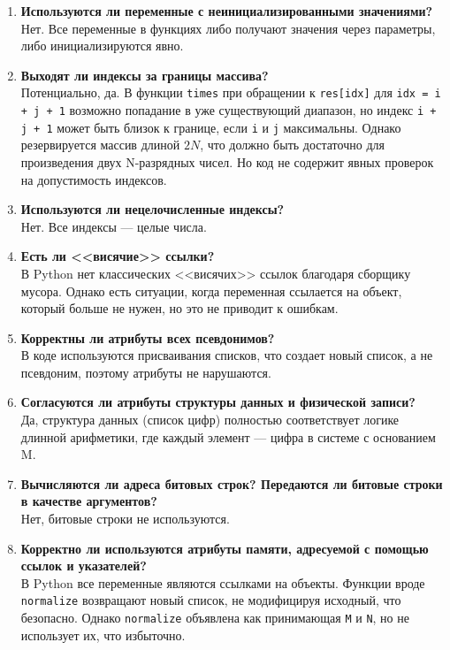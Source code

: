 \documentclass{article}[14pt]
\begin{document}
\begin{enumerate}

\item \textbf{Используются ли переменные с неинициализированными значениями?}
\\
Нет. Все переменные в функциях либо получают значения через параметры, либо инициализируются явно.

\item \textbf{Выходят ли индексы за границы массива?}
\\
Потенциально, да. В функции \texttt{times} при обращении к \texttt{res[idx]} для \texttt{idx = i + j + 1} возможно попадание в уже существующий диапазон, но индекс \texttt{i + j + 1} может быть близок к границе, если \texttt{i} и \texttt{j} максимальны. Однако резервируется массив длиной \(2N\), что должно быть достаточно для произведения двух N-разрядных чисел. Но код не содержит явных проверок на допустимость индексов.

\item \textbf{Используются ли нецелочисленные индексы?}
\\
Нет. Все индексы — целые числа.

\item \textbf{Есть ли <<висячие>> ссылки?}
\\
В Python нет классических <<висячих>> ссылок благодаря сборщику мусора. Однако есть ситуации, когда переменная ссылается на объект, который больше не нужен, но это не приводит к ошибкам.

\item \textbf{Корректны ли атрибуты всех псевдонимов?}
\\
В коде используются присваивания списков, что создает новый список, а не псевдоним, поэтому атрибуты не нарушаются.

\item \textbf{Согласуются ли атрибуты структуры данных и физической записи?}
\\
Да, структура данных (список цифр) полностью соответствует логике длинной арифметики, где каждый элемент — цифра в системе с основанием M.

\item \textbf{Вычисляются ли адреса битовых строк? Передаются ли битовые строки в качестве аргументов?}
\\
Нет, битовые строки не используются.

\item \textbf{Корректно ли используются атрибуты памяти, адресуемой с помощью ссылок и указателей?}
\\
В Python все переменные являются ссылками на объекты. Функции вроде \texttt{normalize} возвращают новый список, не модифицируя исходный, что безопасно. Однако \texttt{normalize} объявлена как принимающая \texttt{M} и \texttt{N}, но не использует их, что избыточно.


\end{enumerate}
\end{document}

